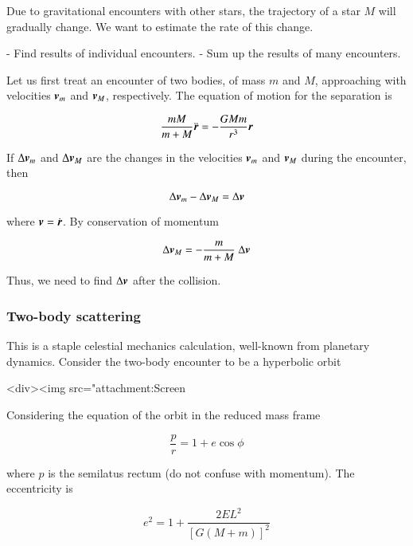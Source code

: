 Due to gravitational encounters with other stars, the trajectory of a star $M$ will gradually change. We want to estimate the rate of this change. 

- Find results of individual encounters.
- Sum up the results of many encounters.


Let us first treat an encounter of two bodies, of mass $m$ and $M$, approaching with velocities ${\boldsymbol{v}}_m$ and ${\boldsymbol{v}}_M$, respectively. The equation of motion for the separation is


\begin{equation}
\frac{mM}{m+M} \ddot{{\boldsymbol{r}}} = -\frac{GMm}{r^3}{\boldsymbol{r}}
\end{equation}


If $\Delta {\boldsymbol{v}}_m$ and $\Delta {\boldsymbol{v}}_M$ are the changes in the velocities ${\boldsymbol{v}}_m$ and ${\boldsymbol{v}}_M$ during the encounter, then 

\begin{equation}
\Delta {\boldsymbol{v}}_m - \Delta {\boldsymbol{v}}_M = \Delta {\boldsymbol{v}} 
\end{equation}

where ${\boldsymbol{v}} = \dot{{\boldsymbol{r}}}$. By conservation of momentum   

\begin{equation}
\Delta \v{v}_M  = - \frac{m}{m+M} \ \Delta \v{v} 
\end{equation}

Thus, we need to find $\Delta{\boldsymbol{v}}$ after the collision.  


\subsubsection{Two-body scattering}

This is a staple celestial mechanics calculation, well-known from planetary dynamics. Consider the two-body encounter to be a hyperbolic orbit 

<div><img src="attachment:Screen%

Considering the equation of the orbit in the reduced mass frame


\begin{equation}
\frac{p}{r}  = 1 + e \cos\phi
\end{equation}

where $p$ is the semilatus rectum (do not confuse with momentum). The eccentricity is 

\begin{equation}
e^2 = 1 + \frac{2EL^2}{[G(M+m)]^2} 
\end{equation}

